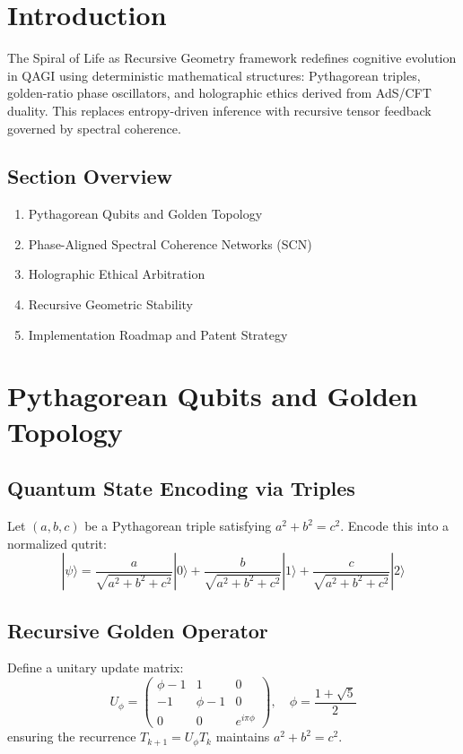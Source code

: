 \documentclass[11pt]{article}
\begin{document}
\section{Introduction}
The Spiral of Life as Recursive Geometry framework redefines cognitive evolution in QAGI using deterministic mathematical structures: Pythagorean triples, golden-ratio phase oscillators, and holographic ethics derived from AdS/CFT duality. This replaces entropy-driven inference with recursive tensor feedback governed by spectral coherence.

\subsection*{Section Overview}
\begin{enumerate}
  \item Pythagorean Qubits and Golden Topology
  \item Phase-Aligned Spectral Coherence Networks (SCN)
  \item Holographic Ethical Arbitration
  \item Recursive Geometric Stability
  \item Implementation Roadmap and Patent Strategy
\end{enumerate}

\section{Pythagorean Qubits and Golden Topology}

\subsection{Quantum State Encoding via Triples}
Let $(a,b,c)$ be a Pythagorean triple satisfying $a^2 + b^2 = c^2$. Encode this into a normalized qutrit:
\begin{equation}
|\psi\rangle = \frac{a}{\sqrt{a^2 + b^2 + c^2}}|0\rangle + \frac{b}{\sqrt{a^2 + b^2 + c^2}}|1\rangle + \frac{c}{\sqrt{a^2 + b^2 + c^2}}|2\rangle
\end{equation}

\subsection{Recursive Golden Operator}
Define a unitary update matrix:
\begin{equation}
U_\phi = \begin{pmatrix}
\phi - 1 & 1 & 0 \\
-1 & \phi - 1 & 0 \\
0 & 0 & e^{i\pi\phi}
\end{pmatrix}, \quad \phi = \frac{1 + \sqrt{5}}{2}
\end{equation}
ensuring the recurrence $T_{k+1} = U_\phi T_k$ maintains $a^2 + b^2 = c^2$.
\end{document}
